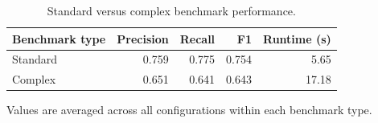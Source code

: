 \begin{table}[htbp]
\centering
\small
\caption{Standard versus complex benchmark performance.}
\label{tab:standard-complex-benchmark}
\begin{tabular}{lrrrr}
\toprule
Benchmark type & Precision & Recall & F1 & Runtime (s) \\
\midrule
Standard & 0.759 & 0.775 & 0.754 & 5.65 \\
Complex & 0.651 & 0.641 & 0.643 & 17.18 \\
\bottomrule
\end{tabular}
\par\footnotesize{Values are averaged across all configurations within each benchmark type.}
\end{table}
